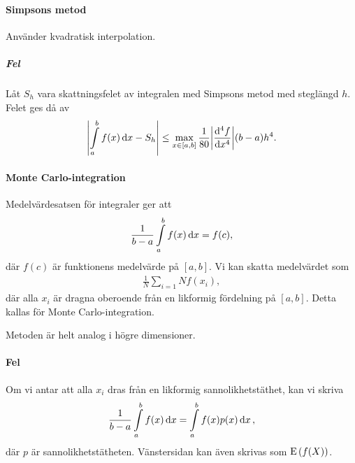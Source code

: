 \paragraph{Simpsons metod}
Använder kvadratisk interpolation.

\subparagraph{Fel}
Låt $S_{h}$ vara skattningsfelet av integralen med Simpsons metod med steglängd $h$. Felet ges då av
\begin{align*}
	\abs{\int\limits_{a}^{b}f(x)\dd{x} - S_{h}} \leq \max\limits_{x\in [a, b]}\frac{1}{80}\abs{\dv[4]{f}{x} (x)}(b - a)h^{4}.
\end{align*}

\paragraph{Monte Carlo-integration}
Medelvärdesatsen för integraler ger att
\begin{align*}
	\frac{1}{b - a}\int\limits_{a}^{b}f(x)\dd{x} = f(c),
\end{align*}
där $f(c)$ är funktionens medelvärde på $[a, b]$. Vi kan skatta medelvärdet som
\begin{align*}
	\frac{1}{N}\sum\limits_{i = 1}{N}f(x_{i}),
\end{align*}
där alla $x_{i}$ är dragna oberoende från en likformig fördelning på $[a, b]$. Detta kallas för Monte Carlo-integration.

Metoden är helt analog i högre dimensioner.

\paragraph{Fel}
Om vi antar att alla $x_{i}$ dras från en likformig sannolikhetstäthet, kan vi skriva
\begin{align*}
	\frac{1}{b - a}\int\limits_{a}^{b}f(x)\dd{x} = \int\limits_{a}^{b}f(x)p(x)\dd{x},
\end{align*}
där $p$ är sannolikhetstätheten. Vänstersidan kan även skrivas som $\text{E}\left(f(X)\right)$.

